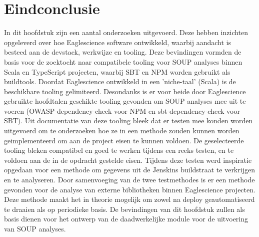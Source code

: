 \section{Eindconclusie}\label{sec:Eindconclusie}
In dit hoofdstuk zijn een aantal onderzoeken uitgevoerd. Deze hebben inzichten opgeleverd over hoe Eaglescience software ontwikkeld, waarbij aandacht is besteed aan de devstack, werkwijze en tooling. Deze bevindingen vormden de basis voor de zoektocht naar compatibele tooling voor SOUP analyses binnen Scala en TypeScript projecten, waarbij SBT en NPM worden gebruikt als buildtools. Doordat Eaglescience ontwikkeld in een 'niche-taal' (Scala) is de beschikbare tooling gelimiteerd. Desondanks is er voor beide door Eaglescience gebruikte hoofdtalen geschikte tooling gevonden om SOUP analyses mee uit te voeren (OWASP-dependency-check voor NPM en sbt-dependency-check voor SBT). Uit documentatie van deze tooling bleek dat er testen mee konden worden uitgevoerd om te onderzoeken hoe ze in een methode zouden kunnen worden geimplementeerd om aan de project eisen te kunnen voldoen. De geselecteerde tooling bleken compatibel en goed te werken tijdens een reeks testen, en te voldoen aan de in de opdracht gestelde eisen. Tijdens deze testen werd inspiratie opgedaan voor een methode om gegevens uit de Jenskins buildstraat te verkrijgen en te analyseren. Door samenvoeging van de twee testmethodes is er een methode gevonden voor de analyse van externe bibliotheken binnen Eaglescience projecten. Deze methode maakt het in theorie mogelijk om zowel na deploy geautomatiseerd te draaien als op periodieke basis. De bevindingen van dit hoofdstuk zullen als basis dienen voor het ontwerp van de daadwerkelijke module voor de uitvoering van SOUP analyses.





